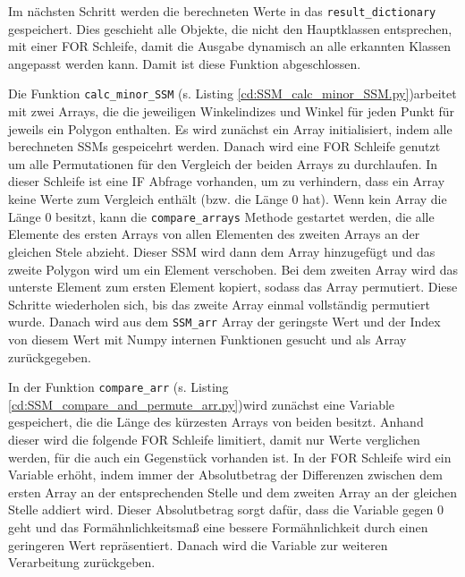 {	Im nächsten Schritt werden die berechneten Werte in das \lstinline|result_dictionary| gespeichert. Dies geschieht alle Objekte, die nicht den Hauptklassen entsprechen, mit einer FOR Schleife, damit die Ausgabe dynamisch an alle erkannten Klassen angepasst werden kann. Damit ist diese Funktion abgeschlossen. \\
	\ifimportant
	
	\fi

	Die Funktion \lstinline|calc_minor_SSM| \ifimportant (s. Listing \ref{cd:SSM_calc_minor_SSM.py})\fi arbeitet mit zwei Arrays, die die jeweiligen Winkelindizes und Winkel für jeden Punkt für jeweils ein Polygon enthalten. Es wird zunächst ein Array initialisiert, indem alle berechneten SSMs gespeicehrt werden. Danach wird eine FOR Schleife genutzt um alle Permutationen für den Vergleich der beiden Arrays zu durchlaufen. In dieser Schleife ist eine IF Abfrage vorhanden, um zu verhindern, dass ein Array keine Werte zum Vergleich enthält (bzw. die Länge 0 hat). Wenn kein Array die Länge 0 besitzt, kann die \lstinline|compare_arrays| Methode gestartet werden, die alle Elemente des ersten Arrays von allen Elementen des zweiten Arrays an der gleichen Stele abzieht. Dieser SSM wird dann dem Array hinzugefügt und das zweite Polygon wird um ein Element verschoben. Bei dem zweiten Array wird das unterste Element zum ersten Element kopiert, sodass das Array permutiert. Diese Schritte wiederholen sich, bis das zweite Array einmal vollständig permutiert wurde. Danach wird aus dem \lstinline|SSM_arr| Array der geringste Wert und der Index von diesem Wert mit Numpy internen Funktionen gesucht und als Array zurückgegeben. \\
	\ifimportant
	
	\fi

	In der Funktion \lstinline|compare_arr| \ifimportant (s. Listing \ref{cd:SSM_compare_and_permute_arr.py})\fi wird zunächst eine Variable gespeichert, die die Länge des kürzesten Arrays von beiden besitzt. Anhand dieser wird die folgende FOR Schleife limitiert, damit nur Werte verglichen werden, für die auch ein Gegenstück vorhanden ist.
	In der FOR Schleife wird ein Variable erhöht, indem immer der Absolutbetrag der Differenzen zwischen dem ersten Array an der entsprechenden Stelle und dem zweiten Array an der gleichen Stelle addiert wird. Dieser Absolutbetrag sorgt dafür, dass die Variable gegen 0 geht und das Formähnlichkeitsmaß eine bessere Formähnlichkeit durch einen geringeren Wert repräsentiert. Danach wird die Variable zur weiteren Verarbeitung zurückgeben.
	\ifimportant
	

}
